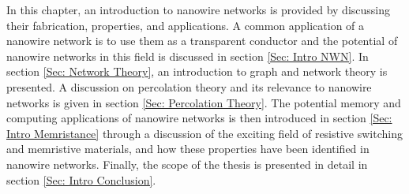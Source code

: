 In this chapter, an introduction to nanowire networks is provided by discussing their fabrication, properties, and applications. A common application of a nanowire network is to use them as a transparent conductor\cite{ye2014,langley2013} and the potential of nanowire networks in this field is discussed in section \ref{Sec: Intro NWN}. In section \ref{Sec: Network Theory}, an introduction to graph and network theory\cite{graph_book} is presented. A discussion on percolation theory\cite{broadbent1957,christensen2002} and its relevance to nanowire networks is given in section \ref{Sec: Percolation Theory}. The potential memory and computing applications of nanowire networks is then introduced in section \ref{Sec: Intro Memristance} through a discussion of the exciting field of resistive switching\cite{kim2011,waser2007,waser2009} and memristive materials\cite{chua1971,strukov2008,memristors2014}, and how these properties have been identified in nanowire networks. Finally, the scope of the thesis is presented in detail in section \ref{Sec: Intro Conclusion}. 
